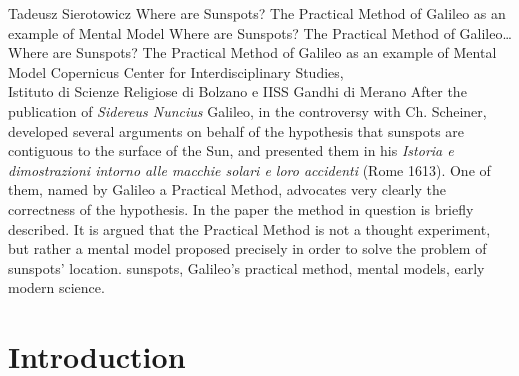 \begin{artengenv}
	{Tadeusz Sierotowicz}
	{Where are Sunspots? The Practical Method of Galileo as an example of Mental Model}
	{Where are Sunspots? The Practical Method of Galileo\ldots}
	{Where are Sunspots? The Practical Method of Galileo as an example of Mental Model}
	{Copernicus Center for Interdisciplinary Studies,\\
		Istituto di Scienze Religiose di Bolzano e IISS Gandhi di Merano}
	{After the publication of \textit{Sidereus Nuncius} Galileo, in the controversy with Ch.
		Scheiner, developed several arguments on behalf of the hypothesis that sunspots are contiguous to the surface of the
		Sun, and presented them in his \textit{Istoria e dimostrazioni intorno alle macchie solari e loro accidenti}
		(Rome 1613).
		One of them, named by Galileo a Practical Method, advocates very clearly the correctness of the
		hypothesis. In the paper the method in question is briefly described. It is argued that the Practical Method is not a
		thought experiment, but rather a mental model proposed precisely in order to solve the problem of sunspots’ location. }
	{sunspots, Galileo’s practical method, mental models, early modern science.}




\section{Introduction}


\end{artengenv}
